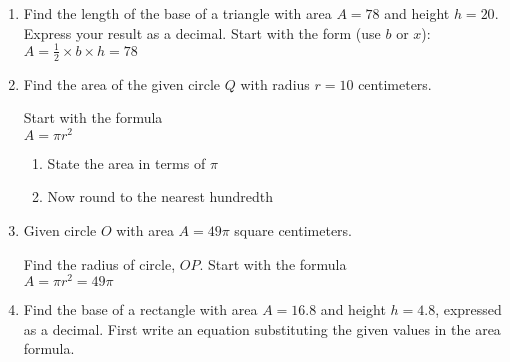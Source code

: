 \begin{enumerate}
\item Find the length of the base of a triangle with area $A=78$ and height $h=20$. Express your result as a decimal. Start with the form (use $b$ or $x$): \\[0.5cm]
$A = \frac{1}{2} \times b \times h = 78$
  \begin{flushright}
  \end{flushright}

\item Find the area of the given circle $Q$ with radius $r=10$ centimeters.
  \begin{multicols}{2}
  \raggedcolumns
  Start with the formula\\[0.5cm]
  $A = \pi r^2$ 
  \begin{enumerate}
    \item State the area in terms of $\pi$ \vspace{1.7cm}
    \item Now round to the nearest hundredth
  \end{enumerate}
  \end{multicols}

\item Given circle $O$ with area $A=49 \pi$ square centimeters.
  \begin{multicols}{2}
  \raggedcolumns
  Find the radius of circle, $OP$. Start with the formula\\[0.5cm]
  $A = \pi r^2 = 49 \pi$ \vspace{1.7cm}
  \end{multicols}

\item Find the base of a rectangle with area $A=16.8$ and height $h=4.8$, expressed as a decimal. First write an equation substituting the given values in the area formula.
  \begin{flushright}
  \end{flushright}


\end{enumerate}
